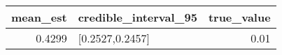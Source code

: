 \begin{longtable}{rlr}
\toprule
mean\_est & credible\_interval\_95 & true\_value \\ 
\midrule
0.4299 & [0.2527,0.2457] & 0.01 \\ 
\bottomrule
\end{longtable}


